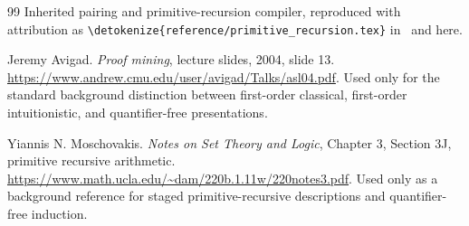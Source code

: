 \documentclass[11pt,letterpaper]{article}
\theoremstyle{definition}\newtheorem{definition}[theorem]{Definition}
\theoremstyle{remark}\newtheorem{remark}[theorem]{Remark}
\newcommand{\file}[1]{\expandafter\nolinkurl\expandafter{\detokenize{#1}}}
\begin{document}
\begin{thebibliography}{99}
Inherited pairing and primitive-recursion compiler, reproduced with
attribution as \file{reference/primitive_recursion.tex} in~\cite{uniform}
and here.

Jeremy Avigad. \emph{Proof mining}, lecture slides, 2004, slide 13.
\url{https://www.andrew.cmu.edu/user/avigad/Talks/asl04.pdf}.
Used only for the standard background distinction between first-order
classical, first-order intuitionistic, and quantifier-free presentations.

Yiannis N. Moschovakis. \emph{Notes on Set Theory and Logic},
Chapter 3, Section 3J, primitive recursive arithmetic.
\url{https://www.math.ucla.edu/~dam/220b.1.11w/220notes3.pdf}.
Used only as a background reference for staged primitive-recursive
descriptions and quantifier-free induction.
\end{thebibliography}
\end{document}
